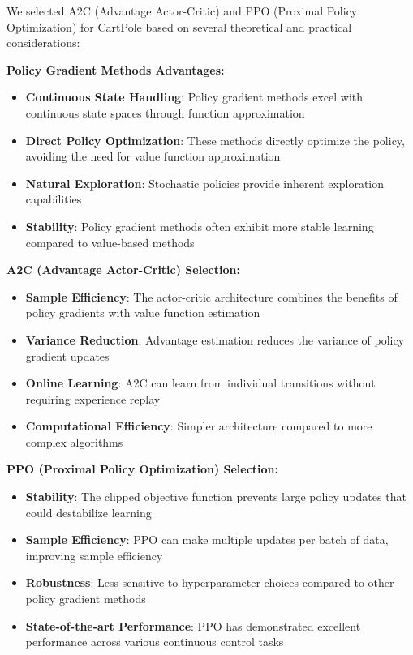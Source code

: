 \documentclass[12pt]{article}
\begin{document}
{{{We selected A2C (Advantage Actor-Critic) and PPO (Proximal Policy Optimization) for CartPole based on several theoretical and practical considerations:

\textbf{Policy Gradient Methods Advantages:}
\begin{itemize}
    \item \textbf{Continuous State Handling}: Policy gradient methods excel with continuous state spaces through function approximation
    \item \textbf{Direct Policy Optimization}: These methods directly optimize the policy, avoiding the need for value function approximation
    \item \textbf{Natural Exploration}: Stochastic policies provide inherent exploration capabilities
    \item \textbf{Stability}: Policy gradient methods often exhibit more stable learning compared to value-based methods
\end{itemize}

\textbf{A2C (Advantage Actor-Critic) Selection:}
\begin{itemize}
    \item \textbf{Sample Efficiency}: The actor-critic architecture combines the benefits of policy gradients with value function estimation
    \item \textbf{Variance Reduction}: Advantage estimation reduces the variance of policy gradient updates
    \item \textbf{Online Learning}: A2C can learn from individual transitions without requiring experience replay
    \item \textbf{Computational Efficiency}: Simpler architecture compared to more complex algorithms
\end{itemize}

\textbf{PPO (Proximal Policy Optimization) Selection:}
\begin{itemize}
    \item \textbf{Stability}: The clipped objective function prevents large policy updates that could destabilize learning
    \item \textbf{Sample Efficiency}: PPO can make multiple updates per batch of data, improving sample efficiency
    \item \textbf{Robustness}: Less sensitive to hyperparameter choices compared to other policy gradient methods
    \item \textbf{State-of-the-art Performance}: PPO has demonstrated excellent performance across various continuous control tasks
\end{itemize}

}}}
\end{document}

